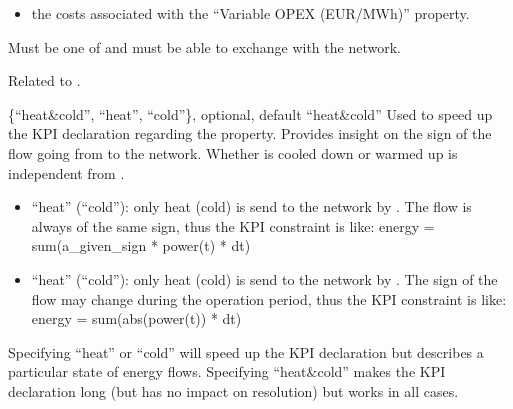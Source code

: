 \documentclass[letterpaper,10pt,english]{sphinxmanual}
\begin{document}
\begin{fulllineitems}
\begin{fulllineitems}
\begin{itemize}
\item {} 
\sphinxAtStartPar
the costs associated with the “Variable OPEX (EUR/MWh)” property.

\end{itemize}

\sphinxAtStartPar
Must be one of  and must be able to exchange  with the network.

\end{fulllineitems}


\begin{fulllineitems}
\label{\detokenize{generated/tamos.network.ThermalNetwork:tamos.network.ThermalNetwork.production_mode}}
\pysigstartsignatures
{}
\pysigstopsignatures
\sphinxAtStartPar
Related to .

\sphinxAtStartPar
\{“heat\&cold”, “heat”, “cold”\}, optional, default “heat\&cold”
Used to speed up the KPI declaration regarding the  property.
Provides insight on the sign of the flow going from  to the network.
Whether  is cooled down or warmed up is independent from .
\begin{itemize}
\item {} 
\sphinxAtStartPar
“heat” (“cold”): only heat (cold) is send to the network by .
The flow is always of the same sign, thus the KPI constraint is like:
energy = sum(a\_given\_sign * power(t) * dt)

\item {} 
\sphinxAtStartPar
“heat” (“cold”): only heat (cold) is send to the network by .
The sign of the flow may change during the operation period, thus the KPI constraint is like:
energy = sum(abs(power(t)) * dt)

\end{itemize}

\sphinxAtStartPar
Specifying “heat” or “cold” will speed up the KPI declaration but describes a particular state of energy flows.
Specifying “heat\&cold” makes the KPI declaration long (but has no impact on resolution) but works in all cases.


\end{fulllineitems}
\end{fulllineitems}
\end{document}
